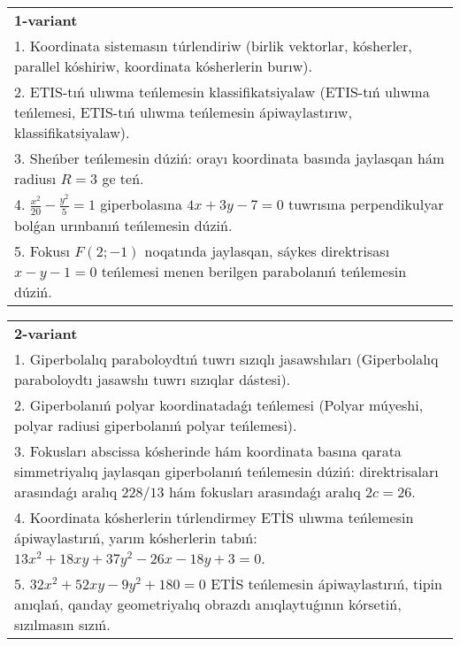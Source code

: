 \documentclass{article}
\begin{document}
\large
{}


\begin{tabular}{m{17cm}}
\textbf{1-variant}\\
1. Koordinata sistemasın túrlendiriw (birlik vektorlar, kósherler, parallel kóshiriw, koordinata kósherlerin burıw).\\

2. ETIS-tıń ulıwma teńlemesin klassifikatsiyalaw (ETIS-tıń ulıwma teńlemesi, ETIS-tıń ulıwma teńlemesin ápiwaylastırıw, klassifikatsiyalaw).\\

3. Sheńber teńlemesin dúziń: orayı koordinata basında jaylasqan hám radiusı $R=3$ ge teń.\\

4. $\frac{x^{2}}{20} - \frac{y^{2}}{5} = 1$ giperbolasına $4x + 3y - 7 = 0$ tuwrısına perpendikulyar bolǵan urınbanıń teńlemesin dúziń.  \\

5. Fokusı $F(2; - 1)$ noqatında jaylasqan, sáykes direktrisası $x - y - 1 = 0$ teńlemesi menen berilgen parabolanıń teńlemesin dúziń.  
\end{tabular}
\vspace{1cm}


\begin{tabular}{m{17cm}}
\textbf{2-variant}\\
1. Giperbolalıq paraboloydtıń tuwrı sızıqlı jasawshıları (Giperbolalıq paraboloydtı jasawshı tuwrı sızıqlar dástesi).\\

2. Giperbolanıń polyar koordinatadaǵı teńlemesi (Polyar múyeshi, polyar radiusi giperbolanıń polyar teńlemesi).\\

3. Fokusları abscissa kósherinde hám koordinata basına qarata simmetriyalıq jaylasqan giperbolanıń teńlemesin dúziń: direktrisaları arasındaǵı aralıq $228/13$ hám fokusları arasındaǵı aralıq $2 c=26$.\\

4. Koordinata kósherlerin túrlendirmey ETİS ulıwma teńlemesin ápiwaylastırıń, yarım kósherlerin tabıń: $13x^{2} + 18xy + 37y^{2} - 26x - 18y + 3 = 0$.  \\

5. $32x^{2} + 52xy - 9y^{2} + 180 = 0$ ETİS teńlemesin ápiwaylastırıń, tipin anıqlań, qanday geometriyalıq obrazdı anıqlaytuǵının kórsetiń, sızılmasın sızıń.  
\end{tabular}
\vspace{1cm}
\end{document}
